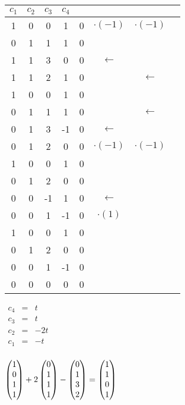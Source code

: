 \begin{enumerate}
							\begin{tabular} {cccc|cccc}
								$c_1$ & $c_2$ & $c_3$ & $c_4$ & & &\\
								\hline
								1 & 0 & 0 & 1 & 0 & $\cdot(-1)$ & $\cdot(-1)$ & \\
								0 & 1 & 1 & 1 & 0 & & & \\
								1 & 1 & 3 & 0 & 0 & $\leftarrow$ & & \\
								1 & 1 & 2 & 1 & 0 & & $\leftarrow$ & \\
								\hline
								1 & 0 & 0 & 1 & 0 & & & \\
								0 & 1 & 1 & 1 & 0 & & $\leftarrow$ & \\
								0 & 1 & 3 & -1 & 0 & $\leftarrow$ & & \\
								0 & 1 & 2 & 0 & 0 & $\cdot(-1)$ & $\cdot(-1)$ & \\
								\hline
								1 & 0 & 0 & 1 & 0 & & & \\
								0 & 1 & 2 & 0 & 0 & & & \\
								0 & 0 & -1 & 1 & 0 & $\leftarrow$ & & \\
								0 & 0 & 1 & -1 & 0 & $\cdot(1)$ & & \\
								\hline
								1 & 0 & 0 & 1 & 0 & & & \\
								0 & 1 & 2 & 0 & 0 & & & \\
								0 & 0 & 1 & -1 & 0 & & & \\
								0 & 0 & 0 & 0 & 0 & & & \\
							\end{tabular}
						
						
						$
							\begin{array} {ccc}
								c_4 & = & t\\
								c_3 & = & t\\
								c_2 & = & -2t\\
								c_1 & = & -t\\
							\end{array}$
						
						
						
							$\mvect{1\\0\\1\\1} + 2\mvect{0\\1\\1\\1} - \mvect{0\\1\\3\\2} = \mvect{1\\1\\0\\1}$
						


\end{enumerate}
